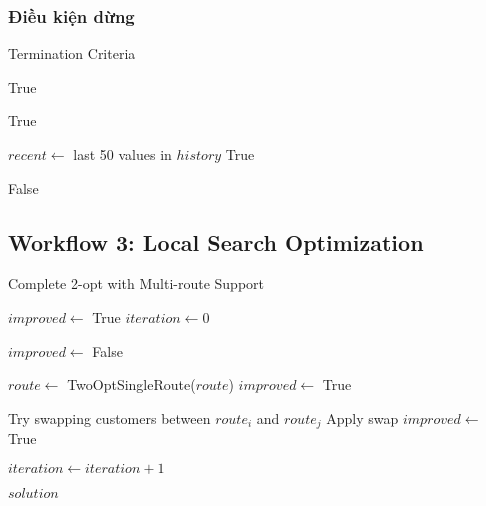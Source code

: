 \documentclass[12pt,a4paper]{article}
\begin{document}
\subsubsection{Điều kiện dừng}

\begin{algorithm}
\caption{Termination Criteria}
\begin{algorithmic}[1]
        \State \Return True
    \EndIf
    
        \State \Return True
    \EndIf
    
    \State $recent \gets$ last 50 values in $history$
        \State \Return True 
    \EndIf
    
    \State \Return False
\EndFunction
\end{algorithmic}
\end{algorithm}

\subsection{Workflow 3: Local Search Optimization}

\begin{algorithm}
\caption{Complete 2-opt with Multi-route Support}
\begin{algorithmic}[1]
    \State $improved \gets$ True
    \State $iteration \gets 0$
    
        \State $improved \gets$ False
        
            \State $route \gets$ TwoOptSingleRoute($route$)
                \State $improved \gets$ True
            \EndIf
        \EndFor
        
                \State Try swapping customers between $route_i$ and $route_j$
                    \State Apply swap
                    \State $improved \gets$ True
                \EndIf
            \EndFor
        \EndFor
        
        \State $iteration \gets iteration + 1$
    \EndWhile
    
    \State \Return $solution$
\EndFunction
\end{algorithmic}
\end{algorithm}
\end{document}
